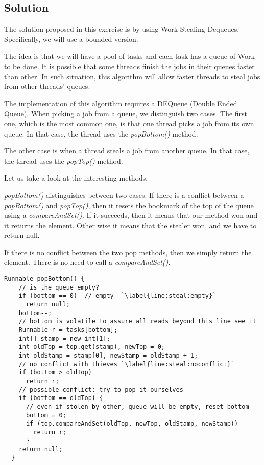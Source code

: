 \subsection{Solution}
\par
The solution proposed in this exercise is by using Work-Stealing Dequeues.
Specifically, we will use a bounded version.
\par
The idea is that we will have a pool of tasks and each task has a queue of Work
to be done. It is possible that some threads finish the jobs in their queues
faster than other. In such situation, this algorithm will allow faster threads
to steal jobs from other threads' queues. 
\par
The implementation of this algorithm requires a DEQueue (Double Ended Queue).
When picking a job from a queue, we distinguish two cases. The first one, which
is the most common one, is that one thread picks a job from its own queue. In
that case, the thread uses the \textit{popBottom()} method.
\par
The other case is when a thread steals a job from another queue. In that case,
the thread uses the \textit{popTop()} method.
\par
Let us take a look at the interesting methods.
\par
\textit{popBottom()} distinguishes between two cases. If there is a conflict
between a \textit{popBottom()} and \textit{popTop()}, then it resets the
bookmark of the top of the queue using a \textit{compareAndSet()}. If it
succeeds, then it means that our method won and it returns the element. Other
wise it means that the stealer won, and we have to return null.
\par
If there is no conflict between the two pop methods, then we simply return the
element. There is no need to call a \textit{compareAndSet()}.
\par
\hfill
\begin{lstlisting}[style=numbers]
  Runnable popBottom() {
    // is the queue empty?
    if (bottom == 0)  // empty  `\label{line:steal:empty}`
      return null;
    bottom--;
    // bottom is volatile to assure all reads beyond this line see it
    Runnable r = tasks[bottom];
    int[] stamp = new int[1];
    int oldTop = top.get(stamp), newTop = 0;
    int oldStamp = stamp[0], newStamp = oldStamp + 1;
    // no conflict with thieves `\label{line:steal:noconflict}`
    if (bottom > oldTop)
      return r;
    // possible conflict: try to pop it ourselves
    if (bottom == oldTop) {
      // even if stolen by other, queue will be empty, reset bottom
      bottom = 0;
      if (top.compareAndSet(oldTop, newTop, oldStamp, newStamp))
        return r;
      } 
    return null;
  }
\end{lstlisting}
\hfill
\par
